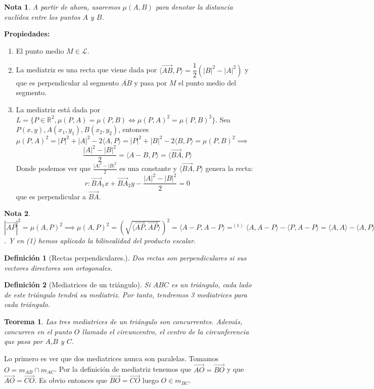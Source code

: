 \documentclass[11pt, a4paper]{article}
\makeatletter
\newif\IfInSansMode
\let\oldsf\sffamily
\renewcommand*{\sffamily}{\oldsf\mathversion{sans}\InSansModetrue}
\let\oldnorm\normalfont
\renewcommand*{\normalfont}{\oldnorm\InSansModefalse\mathversion{normal}}
\renewenvironment{proof}[1][\proofname] {\vspace{-15pt}\par\pushQED{\qed}\normalfont\topsep6\p@\@plus6\p@\relax\trivlist\item[\hskip\labelsep\it#1\@addpunct{.}]\ignorespaces}{\popQED\endtrivlist\@endpefalse}
\renewcommand{\vec}{\overrightarrow}
\renewenvironment{proof}[1][\proofname] {\par\pushQED{\qed}\normalfont\topsep6\p@\@plus6\p@\relax\trivlist\item[\hskip\labelsep\itshape\sffamily#1\@addpunct{.}]\ignorespaces}{\popQED\endtrivlist\@endpefalse}
\theoremstyle{theorem-style}
\newtheorem{nth}{Teorema}[section]
\theoremstyle{definition-style}
\newtheorem{ndef}{Definición}[section]
\theoremstyle{remark-style}
\newtheorem*{nota}{Nota}
\theoremstyle{example-style}
\newenvironment{nlist}
{\begin{enumerate}
    \renewcommand\labelenumi{(\emph{\roman{enumi})}}}
  {\end{enumerate}}
\makeatother
\begin{document}
\begin{nota}
  A partir de ahora, usaremos $\mu(A,B)$ para denotar la distancia euclídea entre los puntos $A$ y $B$.
\end{nota}

\textbf{Propiedades:}
\begin{nlist}
\item El punto medio $M \in \mathcal{L}$. 
\item La mediatriz es una recta que viene dada por $\langle\vec{AB},P\rangle  = \dfrac{1}{2}(|B|^2-|A|^2)$ y que es perpendicular al segmento $\overline{AB}$ y pasa por $M$ el punto medio del segmento.\\
  \begin{proof}
    La mediatriz está dada por $L = \{P\in\mathbb{R}^2, \mu(P,A) = \mu(P,B)\iff \mu(P,A)^2 = \mu(P,B)^2\}$. Sea $P(x,y),A(x_1,y_1),B(x_2,y_2)$, entonces $\mu(P,A)^2 = |P|^2+|A|^2-2\langle A,P\rangle  = |P|^2+|B|^2-2\langle B,P\rangle = \mu(P,B)^2 \implies$ $$ \frac{|A|^2-|B|^2}{2} =\langle A-B,P\rangle  = \langle\vec{BA},P\rangle $$
    Donde podemos ver que $\frac{|A|^2-|B|^2}{2}$ es una constante y $\langle\vec{BA},P\rangle $ genera la recta:
    \[
      r: \vec{BA}_1x+ \vec{BA}_2y - \frac{|A|^2-|B|^2}{2} = 0
    \]
    que es perpendicular a $\vec{BA}$.
  \end{proof}
\end{nlist}
\begin{nota}
  $|\vec{AP}|^2 = \mu(A,P)^2\implies \mu(A,P)^2 = 	\left(\sqrt{\langle \vec{AP},\vec{AP}\rangle }\right)^2 =  \langle A-P, A-P \rangle  =^{(1)} \langle A,A-P\rangle -\langle P,A-P\rangle  =  \langle A,A\rangle  - \langle A,P\rangle +\langle P,P\rangle - \langle P,A\rangle   = |A|^2+|P|^2-2 \langle P,A\rangle $. Y en (1) hemos aplicado la bilinealidad del producto escalar.
\end{nota}
\begin{ndef}[Rectas perpendiculares.]
  Dos rectas son perpendiculares si sus vectores directores son ortogonales.
\end{ndef}

\begin{ndef}[Mediatrices de un triángulo]
  Si $ABC$ es un triángulo, cada lado de este triángulo tendrá su mediatriz. Por tanto, tendremos 3 mediatrices para cada triángulo.
\end{ndef}

\begin{nth}
  Las tres mediatrices de un triángulo son concurrentes. Además, concurren en el punto $O$ llamado el circuncentro, el centro de la circunferencia que pasa por $A$,$B$ y $C$.
\end{nth}
\begin{proof}
  Lo primero es ver que dos mediatrices nunca son paralelas. Tomamos $O = m_{AB} \cap m_{AC}$. Por la definición de mediatriz tenemos que $\vec{AO} = \vec{BO}$ y que $\vec{AO} = \vec{CO}$. Es obvio entonces que $\vec{BO} = \vec{CO}$ luego $O \in m_{BC}$.
\end{proof}
\end{document}
